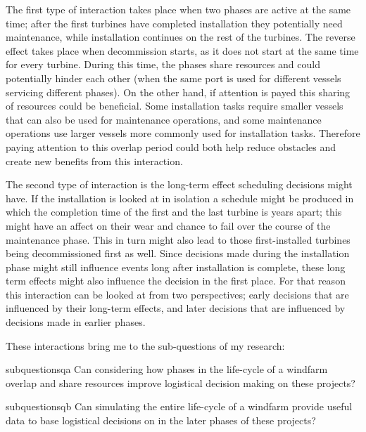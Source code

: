 \documentclass[a4paper,12pt]{article}
\begin{document}
The first type of interaction takes place when two phases are active at the same time; after the first turbines have completed installation they potentially need maintenance, while installation continues on the rest of the turbines. The reverse effect takes place when decommission starts, as it does not start at the same time for every turbine. During this time, the phases share resources and could potentially hinder each other (when the same port is used for different vessels servicing different phases). On the other hand, if attention is payed this sharing of resources could be beneficial. Some installation tasks require smaller vessels that can also be used for maintenance operations, and some maintenance operations use larger vessels more commonly used for installation tasks. Therefore paying attention to this overlap period could both help reduce obstacles and create new benefits from this interaction. 

The second type of interaction is the long-term effect scheduling decisions might have. If the installation is looked at in isolation a schedule might be produced in which the completion time of the first and the last turbine is years apart; this might have an affect on their wear and chance to fail over the course of the maintenance phase. This in turn might also lead to those first-installed turbines being decommissioned first as well. Since decisions made during the installation phase might still influence events long after installation is complete, these long term effects might also influence the decision in the first place. For that reason this interaction can be looked at from two perspectives; early decisions that are influenced by their long-term effects, and later decisions that are influenced by decisions made in earlier phases. 

These interactions bring me to the sub-questions of my research:

\begin{restatable}{subquestion}{sqa}
\label{sqa}
Can considering how phases in the life-cycle of a windfarm overlap and share resources improve logistical decision making on these projects?
\end{restatable}

\begin{restatable}{subquestion}{sqb}
\label{sqb}
Can simulating the entire life-cycle of a windfarm provide useful data to base logistical decisions on in the later phases of these projects?
\end{restatable}
\end{document}

